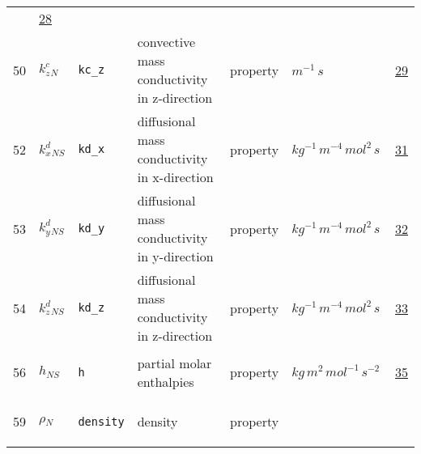 \begin{longtable}{|p{1cm}|p{2.5cm}|p{4.5cm}|p{8cm}|p{3.0cm}|p{3cm}|p{1cm}|}
             &                 \hyperlink{"e:28"}{ 28 }
                 \\
            50
             & \hypertarget{"v:50"}{ $ {{k^c_z}}{_{N}} $}
             & \verb|kc_z|
             & convective mass conductivity in z-direction
             & \begin{lay}property \end{lay}
             & $ m^{-1} \,s \, $
             &                 \hyperlink{"e:29"}{ 29 }
                 \\
            52
             & \hypertarget{"v:52"}{ $ {{k^d_x}}{_{{N S}}} $}
             & \verb|kd_x|
             & diffusional mass conductivity in x-direction
             & \begin{lay}property \end{lay}
             & $ kg^{-1} \,m^{-4} \,mol^{2} \,s \, $
             &                 \hyperlink{"e:31"}{ 31 }
                 \\
            53
             & \hypertarget{"v:53"}{ $ {{k^d_y}}{_{{N S}}} $}
             & \verb|kd_y|
             & diffusional mass conductivity in y-direction
             & \begin{lay}property \end{lay}
             & $ kg^{-1} \,m^{-4} \,mol^{2} \,s \, $
             &                 \hyperlink{"e:32"}{ 32 }
                 \\
            54
             & \hypertarget{"v:54"}{ $ {{k^d_z}}{_{{N S}}} $}
             & \verb|kd_z|
             & diffusional mass conductivity in z-direction
             & \begin{lay}property \end{lay}
             & $ kg^{-1} \,m^{-4} \,mol^{2} \,s \, $
             &                 \hyperlink{"e:33"}{ 33 }
                 \\
            56
             & \hypertarget{"v:56"}{ $ {h}{_{{N S}}} $}
             & \verb|h|
             & partial molar enthalpies
             & \begin{lay}property \end{lay}
             & $ kg \,m^{2} \,mol^{-1} \,s^{-2} \, $
             &                 \hyperlink{"e:35"}{ 35 }
                 \\
            59
             & \hypertarget{"v:59"}{ $ {\rho}{_{N}} $}
             & \verb|density|
             & density
             & \begin{lay}property \end{lay}

\end{longtable}
